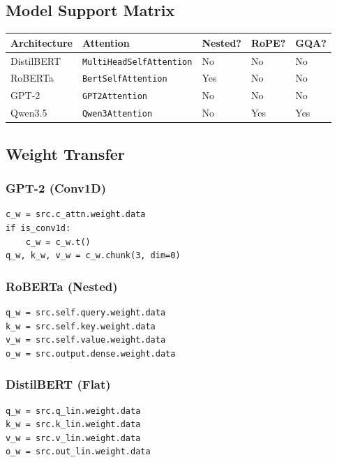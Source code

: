 \subsection{Model Support Matrix}

\begin{table}[H]
\centering
\small
\begin{tabular}{lllll}
\toprule
\textbf{Architecture} & \textbf{Attention} & \textbf{Nested?} & \textbf{RoPE?} & \textbf{GQA?} \\
\midrule
DistilBERT & \texttt{MultiHeadSelfAttention} & No & No & No \\
RoBERTa & \texttt{BertSelfAttention} & Yes & No & No \\
GPT-2 & \texttt{GPT2Attention} & No & No & No \\
Qwen3.5 & \texttt{Qwen3Attention} & No & Yes & Yes \\
\bottomrule
\end{tabular}
\end{table}

\subsection{Weight Transfer}

\subsubsection{GPT-2 (Conv1D)}

\begin{lstlisting}
c_w = src.c_attn.weight.data
if is_conv1d:
    c_w = c_w.t()
q_w, k_w, v_w = c_w.chunk(3, dim=0)
\end{lstlisting}

\subsubsection{RoBERTa (Nested)}

\begin{lstlisting}
q_w = src.self.query.weight.data
k_w = src.self.key.weight.data
v_w = src.self.value.weight.data
o_w = src.output.dense.weight.data
\end{lstlisting}

\subsubsection{DistilBERT (Flat)}

\begin{lstlisting}
q_w = src.q_lin.weight.data
k_w = src.k_lin.weight.data
v_w = src.v_lin.weight.data
o_w = src.out_lin.weight.data
\end{lstlisting}

